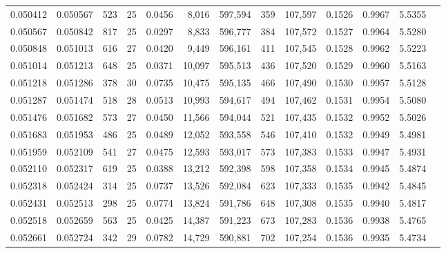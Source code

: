 \begin{tabular}{rrrrrrrrrrrrr}
0.050412 & 0.050567 & 523 &  25 &                                     0.0456 &   8,016 & 597,594 &     359 & 107,597 & 0.1526 & 0.9967 & 5.5355 \\
0.050567 & 0.050842 & 817 &  25 &                                     0.0297 &   8,833 & 596,777 &     384 & 107,572 & 0.1527 & 0.9964 & 5.5280 \\
0.050848 & 0.051013 & 616 &  27 &                                     0.0420 &   9,449 & 596,161 &     411 & 107,545 & 0.1528 & 0.9962 & 5.5223 \\
0.051014 & 0.051213 & 648 &  25 &                                     0.0371 &  10,097 & 595,513 &     436 & 107,520 & 0.1529 & 0.9960 & 5.5163 \\
0.051218 & 0.051286 & 378 &  30 &                                     0.0735 &  10,475 & 595,135 &     466 & 107,490 & 0.1530 & 0.9957 & 5.5128 \\
0.051287 & 0.051474 & 518 &  28 &                                     0.0513 &  10,993 & 594,617 &     494 & 107,462 & 0.1531 & 0.9954 & 5.5080 \\
0.051476 & 0.051682 & 573 &  27 &                                     0.0450 &  11,566 & 594,044 &     521 & 107,435 & 0.1532 & 0.9952 & 5.5026 \\
0.051683 & 0.051953 & 486 &  25 &                                     0.0489 &  12,052 & 593,558 &     546 & 107,410 & 0.1532 & 0.9949 & 5.4981 \\
0.051959 & 0.052109 & 541 &  27 &                                     0.0475 &  12,593 & 593,017 &     573 & 107,383 & 0.1533 & 0.9947 & 5.4931 \\
0.052110 & 0.052317 & 619 &  25 &                                     0.0388 &  13,212 & 592,398 &     598 & 107,358 & 0.1534 & 0.9945 & 5.4874 \\
0.052318 & 0.052424 & 314 &  25 &                                     0.0737 &  13,526 & 592,084 &     623 & 107,333 & 0.1535 & 0.9942 & 5.4845 \\
0.052431 & 0.052513 & 298 &  25 &                                     0.0774 &  13,824 & 591,786 &     648 & 107,308 & 0.1535 & 0.9940 & 5.4817 \\
0.052518 & 0.052659 & 563 &  25 &                                     0.0425 &  14,387 & 591,223 &     673 & 107,283 & 0.1536 & 0.9938 & 5.4765 \\
0.052661 & 0.052724 & 342 &  29 &                                     0.0782 &  14,729 & 590,881 &     702 & 107,254 & 0.1536 & 0.9935 & 5.4734 \\

\end{tabular}
